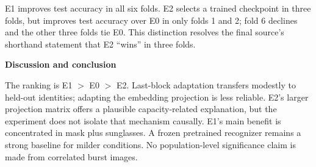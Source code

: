 \documentclass[11pt,a4paper]{article}
\newcommand{\cont}[1]{\par{\sffamily\bfseries #1}\par}
\begin{document}
E1 improves test accuracy in all six folds. E2 selects a trained checkpoint in three folds, but improves test accuracy over E0 in only folds 1 and 2; fold 6 declines and the other three folds tie E0. This distinction resolves the final source's shorthand statement that E2 ``wins'' in three folds.

\cont{Discussion and conclusion}
The ranking is E1 $>$ E0 $>$ E2. Last-block adaptation transfers modestly to held-out identities; adapting the embedding projection is less reliable. E2's larger projection matrix offers a plausible capacity-related explanation, but the experiment does not isolate that mechanism causally. E1's main benefit is concentrated in mask plus sunglasses. A frozen pretrained recognizer remains a strong baseline for milder conditions. No population-level significance claim is made from correlated burst images.
\end{document}

